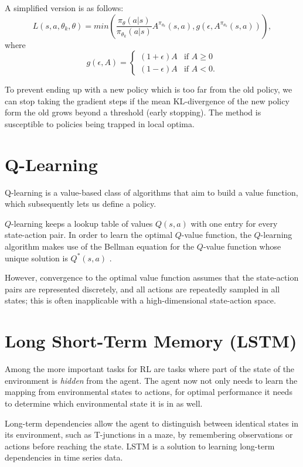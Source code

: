 \documentclass{article}
\begin{document}
A simplified version is as follows: $$L(s,a,\theta_k,\theta) = min \left( \frac{\pi_\theta(a|s)}{\pi_{\theta_k}(a|s)} A^{\pi_{\theta_k}}(s,a), g(\epsilon, A^{\pi_{\theta_k}}(s,a)) \right),$$ where $$g(\epsilon, A) = \begin{cases} (1+\epsilon)A & \mbox{if } A \geq 0 \\ (1-\epsilon)A & \mbox{if } A < 0. \end{cases}$$

To prevent ending up with a new policy which is too far from the old policy, we can stop taking the gradient steps if the mean KL-divergence of the new policy form the old grows beyond a threshold (early stopping). The method is susceptible to policies being trapped in local optima.

\section{Q-Learning}
Q-learning is a value-based class of algorithms that aim to build a value function, which subsequently lets us define a policy.

$Q$-learning keeps a lookup table of values $Q(s,a)$ with one entry for every state-action pair. In order to learn the optimal $Q$-value function, the $Q$-learning algorithm makes use of the Bellman equation for the $Q$-value function whose unique solution is $Q^*(s,a)$ \cite{DBLP:journals/corr/abs-1811-12560}.

However, convergence to the optimal value function assumes that the state-action pairs are represented discretely, and all actions are repeatedly sampled in all states; this is often inapplicable with a high-dimensional state-action space.

\section{Long Short-Term Memory (LSTM) \cite{RLLSTM}}

Among the more important tasks for RL are tasks where part of the state of the environment is \textit{hidden} from the agent. The agent now not only needs to learn the mapping from environmental states to actions, for optimal performance it needs to determine which environmental state it is in as well.

Long-term dependencies allow the agent to distinguish between identical states in its environment, such as T-junctions in a maze, by remembering observations or actions before reaching the state. LSTM is a solution to learning long-term dependencies in time series data.
\end{document}
